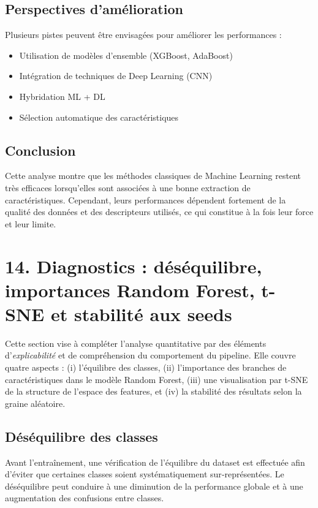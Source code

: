 \documentclass[12pt,a4paper]{article}
\begin{document}
    \subsection{Perspectives d’amélioration}

    Plusieurs pistes peuvent être envisagées pour améliorer les performances :
    \begin{itemize}
        \item Utilisation de modèles d’ensemble (XGBoost, AdaBoost)
        \item Intégration de techniques de Deep Learning (CNN)
        \item Hybridation ML + DL
        \item Sélection automatique des caractéristiques
    \end{itemize}

    \subsection{Conclusion}

    Cette analyse montre que les méthodes classiques de Machine Learning restent très efficaces lorsqu’elles sont associées à une bonne extraction de caractéristiques.
    Cependant, leurs performances dépendent fortement de la qualité des données et des descripteurs utilisés, ce qui constitue à la fois leur force et leur limite.

    \section{14. Diagnostics : déséquilibre, importances Random Forest, t-SNE et stabilité aux seeds}

    Cette section vise à compléter l’analyse quantitative par des éléments d’\textit{explicabilité} et de compréhension du comportement du pipeline.
    Elle couvre quatre aspects : (i) l’équilibre des classes, (ii) l’importance des branches de caractéristiques dans le modèle Random Forest, (iii) une visualisation par t-SNE de la structure de l’espace des features, et (iv) la stabilité des résultats selon la graine aléatoire.

    \subsection{Déséquilibre des classes}
    Avant l’entraînement, une vérification de l’équilibre du dataset est effectuée afin d’éviter que certaines classes soient systématiquement sur‑représentées.
    Le déséquilibre peut conduire à une diminution de la performance globale et à une augmentation des confusions entre classes.
\end{document}
